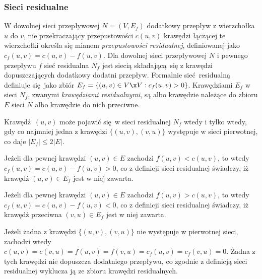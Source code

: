 \subsubsection{Sieci residualne}
\par{
  W dowolnej sieci przepływowej $N=(V, E_f)$ dodatkowy przepływ z wierzchołka $u$ do $v$, nie przekraczający przepustowości $c(u, v)$ krawędzi łączącej te wierzchołki określa się mianem \emph{przepustowości residualnej}, definiowanej jako $c_f(u ,v) = c(u, v) - f(u, v)$.
  Dla dowolnej sieci przepływowej $N$ i pewnego przepływu $f$ sieć residualna $N_f$ jest siecią składającą się z krawędzi dopuszczających dodatkowy dodatni przepływ. Formalnie sieć residualną definiuje się jako zbiór $E_f=\{(u, v) \in V \x V: c_f(u,v) > 0\}$.
  Krawędziami $E_f$ w sieci $N_f$, zwanymi \emph{krawędziami residualnymi}, są albo krawędzie należące do zbioru $E$ sieci $N$ albo krawędzie do nich przeciwne.
  \begin{theorem}
    Krawędź $(u, v)$ może pojawić się w sieci residualnej $N_f$ wtedy i tylko wtedy, gdy co najmniej jedna z krawędzi $\{(u, v), (v, u)\}$ występuje w sieci pierwotnej, co daje $|E_f| \leq 2|E|$.
  \end{theorem}
  \begin{bproof}
    Jeżeli dla pewnej krawędzi $(u, v) \in E$ zachodzi $f(u, v) < c(u, v)$, to wtedy $c_f(u, v) = c(u, v) - f(u, v) > 0$, co z definicji sieci residualnej świadczy, iż krawędź $(u, v) \in E_f$ jest w niej zawarta.

    Jeżeli dla pewnej krawędzi $(u, v) \in E$ zachodzi $f(u, v) > c(u, v)$, to wtedy $c_f(u, v) = c(u, v) - f(u, v) < 0$, co z definicji sieci residualnej świadczy, iż krawędź przeciwna $(v, u) \in E_f$  jest w niej zawarta.

    Jeżeli żadna z krawędzi $\{(u, v), (v, u)\}$ nie występuje w pierwotnej sieci, zachodzi wtedy $c(u, v) = c(v, u) = f(u, v) = f(v, u) = c_f(u, v) = c_f(v, u)=0$. Żadna z tych krawędzi nie dopuszcza dodatniego przepływu, co zgodnie z definicją sieci residualnej wyklucza ją ze zbioru krawędzi residualnych.
  \end{bproof}
}

